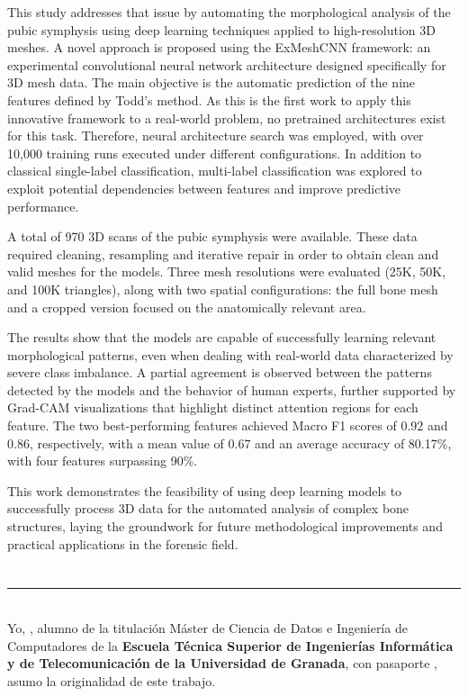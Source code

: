 This study addresses that issue by automating the morphological analysis of the pubic symphysis using deep learning techniques applied to high-resolution 3D meshes. A novel approach is proposed using the ExMeshCNN framework: an experimental convolutional neural network architecture designed specifically for 3D mesh data. The main objective is the automatic prediction of the nine features defined by Todd's method. As this is the first work to apply this innovative framework to a real-world problem, no pretrained architectures exist for this task. Therefore, neural architecture search was employed, with over 10,000 training runs executed under different configurations. In addition to classical single-label classification, multi-label classification was explored to exploit potential dependencies between features and improve predictive performance.

A total of 970 3D scans of the pubic symphysis were available. These data required cleaning, resampling and iterative repair in order to obtain clean and valid meshes for the models. Three mesh resolutions were evaluated (25K, 50K, and 100K triangles), along with two spatial configurations: the full bone mesh and a cropped version focused on the anatomically relevant area.

The results show that the models are capable of successfully learning relevant morphological patterns, even when dealing with real-world data characterized by severe class imbalance. A partial agreement is observed between the patterns detected by the models and the behavior of human experts, further supported by Grad-CAM visualizations that highlight distinct attention regions for each feature. The two best-performing features achieved Macro F1 scores of 0.92 and 0.86, respectively, with a mean value of 0.67 and an average accuracy of 80.17\%, with four features surpassing 90\%.

This work demonstrates the feasibility of using deep learning models to successfully process 3D data for the automated analysis of complex bone structures, laying the groundwork for future methodological improvements and practical applications in the forensic field.
\chapter*{}
\thispagestyle{empty}

\noindent\rule[-1ex]{\textwidth}{2pt}\\[4.5ex]

Yo, \textbf{\myName}, alumno de la titulación Máster de Ciencia de Datos e Ingeniería de Computadores de la \textbf{Escuela Técnica Superior
de Ingenierías Informática y de Telecomunicación de la Universidad de Granada}, con pasaporte \myDNI, asumo la originalidad de este trabajo.

